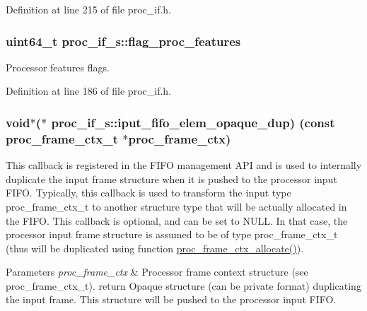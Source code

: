 Definition at line 215 of file proc\+\_\+if.\+h.

\subsubsection[{\texorpdfstring{flag\+\_\+proc\+\_\+features}{flag_proc_features}}]{\setlength{\rightskip}{0pt plus 5cm}uint64\+\_\+t proc\+\_\+if\+\_\+s\+::flag\+\_\+proc\+\_\+features}\hypertarget{structproc__if__s_a657d976a32c34bff11070599b11c2dd7}{}\label{structproc__if__s_a657d976a32c34bff11070599b11c2dd7}
Processor features flags. 

Definition at line 186 of file proc\+\_\+if.\+h.

\subsubsection[{\texorpdfstring{iput\+\_\+fifo\+\_\+elem\+\_\+opaque\+\_\+dup}{iput_fifo_elem_opaque_dup}}]{\setlength{\rightskip}{0pt plus 5cm}void$\ast$($\ast$ proc\+\_\+if\+\_\+s\+::iput\+\_\+fifo\+\_\+elem\+\_\+opaque\+\_\+dup) (const {\bf proc\+\_\+frame\+\_\+ctx\+\_\+t} $\ast$proc\+\_\+frame\+\_\+ctx)}\hypertarget{structproc__if__s_a558cec57df436699d4154775894f2313}{}\label{structproc__if__s_a558cec57df436699d4154775894f2313}
This callback is registered in the F\+I\+FO management A\+PI and is used to internally duplicate the input frame structure when it is pushed to the processor input F\+I\+FO. Typically, this callback is used to transform the input type proc\+\_\+frame\+\_\+ctx\+\_\+t to another structure type that will be actually allocated in the F\+I\+FO. This callback is optional, and can be set to N\+U\+LL. In that case, the processor input frame structure is assumed to be of type proc\+\_\+frame\+\_\+ctx\+\_\+t (thus will be duplicated using function \textquotesingle{}\hyperlink{proc__if_8c_a26df07b260850afd03ec73572608a034}{proc\+\_\+frame\+\_\+ctx\+\_\+allocate()}\textquotesingle{}). 
\begin{DoxyParams}{Parameters}
{\em proc\+\_\+frame\+\_\+ctx} & Processor frame context structure (see proc\+\_\+frame\+\_\+ctx\+\_\+t). return Opaque structure (can be private format) duplicating the input frame. This structure will be pushed to the processor input F\+I\+FO. \\
\hline
\end{DoxyParams}


